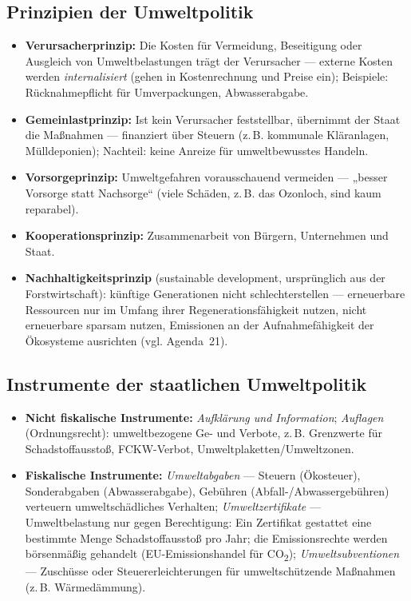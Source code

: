 \documentclass[11pt, a4paper]{article}
\begin{document}
\subsection{Prinzipien der Umweltpolitik}

\begin{itemize}
  \item \textbf{Verursacherprinzip:} Die Kosten für Vermeidung, Beseitigung oder Ausgleich
    von Umweltbelastungen trägt der Verursacher --- externe Kosten werden
    \emph{internalisiert} (gehen in Kostenrechnung und Preise ein); Beispiele:
    Rücknahmepflicht für Umverpackungen, Abwasserabgabe.
  \item \textbf{Gemeinlastprinzip:} Ist kein Verursacher feststellbar, übernimmt der Staat
    die Maßnahmen --- finanziert über Steuern (z.\,B. kommunale Kläranlagen, Mülldeponien);
    Nachteil: keine Anreize für umweltbewusstes Handeln.
  \item \textbf{Vorsorgeprinzip:} Umweltgefahren vorausschauend vermeiden --- „besser
    Vorsorge statt Nachsorge`` (viele Schäden, z.\,B. das Ozonloch, sind kaum reparabel).
  \item \textbf{Kooperationsprinzip:} Zusammenarbeit von Bürgern, Unternehmen und Staat.
  \item \textbf{Nachhaltigkeitsprinzip} (sustainable development, ursprünglich aus der
    Forstwirtschaft): künftige Generationen nicht schlechterstellen --- erneuerbare
    Ressourcen nur im Umfang ihrer Regenerationsfähigkeit nutzen, nicht erneuerbare sparsam
    nutzen, Emissionen an der Aufnahmefähigkeit der Ökosysteme ausrichten (vgl. Agenda~21).
\end{itemize}

\subsection{Instrumente der staatlichen Umweltpolitik}

\begin{itemize}
  \item \textbf{Nicht fiskalische Instrumente:} \emph{Aufklärung und Information};
    \emph{Auflagen} (Ordnungsrecht): umweltbezogene Ge- und Verbote, z.\,B. Grenzwerte für
    Schadstoffausstoß, FCKW-Verbot, Umweltplaketten/Umweltzonen.
  \item \textbf{Fiskalische Instrumente:}
    \emph{Umweltabgaben} --- Steuern (Ökosteuer), Sonderabgaben (Abwasserabgabe), Gebühren
    (Abfall-/Abwassergebühren) verteuern umweltschädliches Verhalten;
    \emph{Umweltzertifikate} --- Umweltbelastung nur gegen Berechtigung: Ein Zertifikat
    gestattet eine bestimmte Menge Schadstoffausstoß pro Jahr; die Emissionsrechte werden
    börsenmäßig gehandelt (EU-Emissionshandel für CO\textsubscript{2});
    \emph{Umweltsubventionen} --- Zuschüsse oder Steuererleichterungen für
    umweltschützende Maßnahmen (z.\,B. Wärmedämmung).
\end{itemize}
\end{document}
